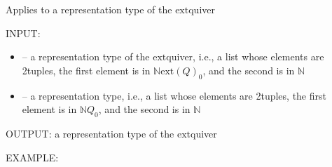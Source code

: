 \documentclass[letterpaper,10pt,english]{sphinxmanual}
\begin{document}

\begin{fulllineitems}
\label{\detokenize{index:quivercombinatorics.D_map_on_rep}}
\pysigstartsignatures
\pysiglinewithargsret
{}
{\sphinxparamcomma {}}
{}
\pysigstopsignatures
\sphinxAtStartPar
Applies  to a representation type of the \(\mathrm{ext}\)\sphinxhyphen{}quiver

\sphinxAtStartPar
INPUT:
\begin{itemize}
\item {} 
\sphinxAtStartPar
{} – a representation type of the \(\mathrm{ext}\)\sphinxhyphen{}quiver, i.e., a list whose elements are 2\sphinxhyphen{}tuples, the first element is in \(\mathbb{N}\mathrm{ext}(Q)_0\), and the second is in \(\mathbb{N}\)

\item {} 
\sphinxAtStartPar
{} – a representation type, i.e., a list whose elements are 2\sphinxhyphen{}tuples, the first element is in \(\mathbb{N}Q_0\), and the second is in \(\mathbb{N}\)

\end{itemize}

\sphinxAtStartPar
OUTPUT: a representation type of the \(\mathrm{ext}\)\sphinxhyphen{}quiver

\sphinxAtStartPar
EXAMPLE:

\begin{sphinxVerbatim}[commandchars=\\\{\}]
  
   \PYG{p}{[}\PYG{p}{[}  \PYG{p}{]} \PYG{p}{[}  \PYG{p}{]} \PYG{p}{[}  \PYG{p}{]} \PYG{p}{[}  \PYG{p}{]}\PYG{p}{]}
 \PYG{p}{[}\PYG{p}{[}    \PYG{p}{]}\PYG{p}{]}
\PYG{p}{[}\PYG{p}{[}  \PYG{p}{]}\PYG{p}{]}
\end{sphinxVerbatim}

\end{fulllineitems}
\end{document}
